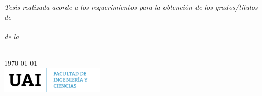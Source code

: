 \documentclass[
11pt, %
oneside, %
spanish, %
singlespacing, %
parskip, %
headsepline, %
table
]{MastersDoctoralThesis} %
\begin{document}
\begin{titlepage}
\begin{center}
\vfill

\large \textit{Tesis realizada acorde a los requerimientos para la obtención de los grados/títulos de\\ \textbf{\degreename}}\\[0.3cm] %
\textit{de la}\\[0.4cm]
\facname\\[1.5cm] %
 
\vfill

{\large \today}\\[2cm] %
\includegraphics[width=5cm]{fic.png} %
 
\vfill
\end{center}
\end{titlepage}

\end{document}
